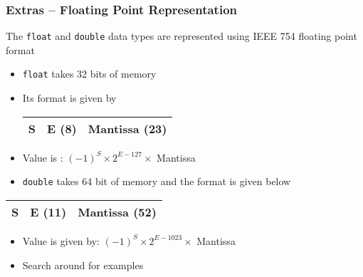 \documentclass[11pt]{beamer}
\begin{document}
\begin{frame}[fragile]\frametitle{Extras -- Floating Point Representation}
\label{sec-1-18}

The \verb~float~ and \verb~double~ data types are represented using IEEE 754 floating point format
\begin{itemize}
\item \verb~float~ takes 32 bits of memory
\item Its format is given by 

\begin{center}
\begin{tabular}{|p{1ex}|p{8ex}|p{23ex}|}
\hline
 S  &  E (8)  &  Mantissa (23)  \\
\hline
\end{tabular}
\end{center}


\item Value is : $(-1)^{S} \times 2^{E-127}\times$ Mantissa
\item \verb~double~ takes 64 bit of memory and the format is given below
\end{itemize}

\begin{center}
\begin{tabular}{|p{1ex}|p{11ex}|p{42ex}|}
\hline
 S  &  E (11)  &  Mantissa (52)  \\
\hline
\end{tabular}
\end{center}


\begin{itemize}
\item Value is given by: $(-1)^{S}\times 2^{E-1023}\times$ Mantissa
\item Search around for examples
\end{itemize}
\end{frame}
\end{document}

